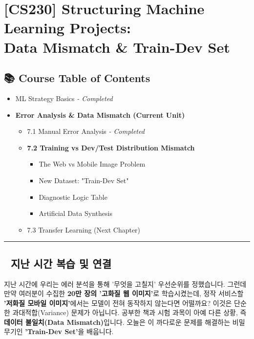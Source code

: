 \documentclass[11pt,a4paper]{book}
\theoremstyle{definition}
\begin{document}
\chapter{[CS230] Structuring Machine Learning Projects: \\ Data Mismatch \& Train-Dev Set}
\label{ch:lecture26}

\section*{📚 Course Table of Contents}
\begin{itemize}
    \item[Chapter 1-6.] ML Strategy Basics \textit{- Completed}
    \item[\textbf{Chapter 7.}] \textbf{Error Analysis \& Data Mismatch (Current Unit)}
    \begin{itemize}
        \item 7.1 Manual Error Analysis \textit{- Completed}
        \item \textbf{7.2 Training vs Dev/Test Distribution Mismatch}
        \begin{itemize}
            \item The Web vs Mobile Image Problem
            \item New Dataset: "Train-Dev Set"
            \item Diagnostic Logic Table
            \item Artificial Data Synthesis
        \end{itemize}
        \item 7.3 Transfer Learning (Next Chapter)
    \end{itemize}
\end{itemize}

\vspace{0.5cm}
\hrule
\vspace{0.5cm}

\section*{🔗 지난 시간 복습 및 연결}
지난 시간에 우리는 에러 분석을 통해 '무엇을 고칠지' 우선순위를 정했습니다.
그런데 만약 여러분이 수집한 \textbf{20만 장의 '고화질 웹 이미지'}로 학습시켰는데, 정작 서비스할 \textbf{'저화질 모바일 이미지'}에서는 모델이 전혀 동작하지 않는다면 어떨까요?
이것은 단순한 과대적합(Variance) 문제가 아닙니다. 공부한 책과 시험 과목이 아예 다른 상황, 즉 \textbf{데이터 불일치(Data Mismatch)}입니다. 오늘은 이 까다로운 문제를 해결하는 비밀 무기인 \textbf{'Train-Dev Set'}을 배웁니다.
\end{document}
